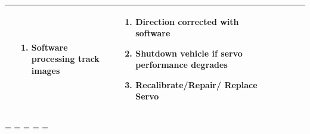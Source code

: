 \documentclass [10pt]{article}
\begin{document}
{\begin{minipage}{\textwidth}
\begin{longtable}{ |p{ }  | p{ } |  p{ } |  p{ } | p{ } | p{ } |  p{ }|}
\begin{minipage}{.18\textwidth}
        \end{minipage}
    & \begin{minipage}{.22\textwidth} 
                \vspace{2mm}
                \begin{enumerate}
                    \item Software processing track images \vspace {1mm}
                \end{enumerate}
        \end{minipage}
    
    
    & \begin{minipage}{.24 \columnwidth} 
                \vspace{2mm}
                \begin{enumerate}
                    \item Direction corrected with software
                    \item Shutdown vehicle if servo performance degrades
                    \item Recalibrate/Repair/ Replace Servo \vspace {1mm}
                \end{enumerate}
        \end{minipage} \\ \hline
   
    
    
    
   
 
    
    
    
 
 
 \end{longtable}
    
    
    
    \end{minipage}}





\begin{landscape}
\end{landscape}
\endgroup


\newpage
\paperwidth=\pdfpageheight
\paperheight=\pdfpagewidth
\pdfpageheight=\paperheight
\pdfpagewidth=\paperwidth
\headwidth=\textwidth
\end{document}
